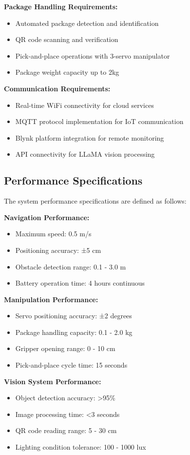 \textbf{Package Handling Requirements:}
\begin{itemize}
\item Automated package detection and identification
\item QR code scanning and verification
\item Pick-and-place operations with 3-servo manipulator
\item Package weight capacity up to 2kg
\end{itemize}

\textbf{Communication Requirements:}
\begin{itemize}
\item Real-time WiFi connectivity for cloud services
\item MQTT protocol implementation for IoT communication
\item Blynk platform integration for remote monitoring
\item API connectivity for LLaMA vision processing
\end{itemize}

\subsection{Performance Specifications}
The system performance specifications are defined as follows:

\textbf{Navigation Performance:}
\begin{itemize}
\item Maximum speed: 0.5 m/s
\item Positioning accuracy: ±5 cm
\item Obstacle detection range: 0.1 - 3.0 m
\item Battery operation time: 4 hours continuous
\end{itemize}

\textbf{Manipulation Performance:}
\begin{itemize}
\item Servo positioning accuracy: ±2 degrees
\item Package handling capacity: 0.1 - 2.0 kg
\item Gripper opening range: 0 - 10 cm
\item Pick-and-place cycle time: 15 seconds
\end{itemize}

\textbf{Vision System Performance:}
\begin{itemize}
\item Object detection accuracy: >95\%
\item Image processing time: <3 seconds
\item QR code reading range: 5 - 30 cm
\item Lighting condition tolerance: 100 - 1000 lux
\end{itemize}

